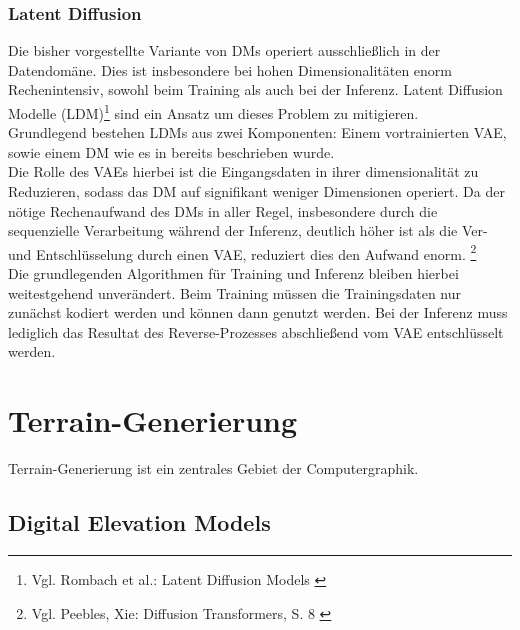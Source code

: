 \subsubsection{Latent Diffusion}

Die bisher vorgestellte Variante von DMs operiert ausschließlich in der Datendomäne. Dies ist insbesondere bei hohen Dimensionalitäten enorm Rechenintensiv, sowohl beim Training als auch bei der Inferenz. Latent Diffusion Modelle (LDM)\footnote{
    Vgl. Rombach et al.: Latent Diffusion Models
    \cite{rombach2022high}
}  sind ein Ansatz um dieses Problem zu mitigieren. \\
Grundlegend bestehen LDMs aus zwei Komponenten: Einem vortrainierten VAE, sowie einem DM wie es in bereits beschrieben wurde. \\
Die Rolle des VAEs hierbei ist die Eingangsdaten in ihrer dimensionalität zu Reduzieren, sodass das DM auf signifikant weniger Dimensionen operiert. Da der nötige Rechenaufwand des DMs in aller Regel, insbesondere durch die sequenzielle Verarbeitung während der Inferenz, deutlich höher ist als die Ver- und Entschlüsselung durch einen VAE, reduziert dies den Aufwand enorm. \footnote{
    Vgl. Peebles, Xie: Diffusion Transformers, S. 8
    \cite{peebles2023scalable}
} \\
Die grundlegenden Algorithmen für Training und Inferenz bleiben hierbei weitestgehend unverändert. Beim Training müssen die Trainingsdaten nur zunächst kodiert werden und können dann genutzt werden. Bei der Inferenz muss lediglich das Resultat des Reverse-Prozesses abschließend vom \ac{VAE} entschlüsselt werden.


\section{Terrain-Generierung}

Terrain-Generierung ist ein zentrales Gebiet der Computergraphik. 

\subsection{Digital Elevation Models}


